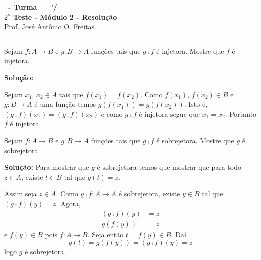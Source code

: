 \documentclass[12pt]{exam}
\begin{document}
\begin{center}
{\Large\bf \disciplina\ - Turma \turma\ -- \semestre$^{o}$/\ano} \\ \vspace{9pt} {\large\bf
$2^{\underline{o}}$ Teste - M\'odulo 2 - Resolu\c{c}\~ao}\\
\vspace{9pt} Prof. Jos{\'e} Ant{\^o}nio O. Freitas
\end{center}
\hrule

\vspace{.6cm}

\questao Sejam $f : A \to B$ e $g : B \to A$ fun\c{c}\~oes tais que $g \comp f$ \'e injetora. Mostre que $f$ \'e injetora.

\noindent\textbf{Solu\c{c}\~ao:}

	Sejam $x_1$, $x_2 \in A$ tais que $f(x_1) = f(x_2)$. Como $f(x_1)$, $f(x_2) \in B$ e $g : B \to A$ \'e uma fun\c{c}\~ao temos $g(f(x_1)) = g(f(x_2))$. Isto \'e, $(g \comp f)(x_1) = (g \comp f)(x_2)$ e como $g \comp f$ \'e injetora segue que $x_1 = x_2$. Portanto $f$ \'e injetora.

\vspace{.5cm}

\questao Sejam $f : A \to B$ e $g : B \to A$ fun\c{c}\~oes tais que $g \comp f$ \'e sobrejetora. Mostre que $g$ \'e sobrejetora.

\noindent\textbf{Solu\c{c}\~ao:} Para mostrar que $g$ é sobrejetora temos que mostrar que para todo $z \in A$, existe $t \in B$ tal que $g(t) = z$.

Assim seja $z \in A$. Como $g \comp f : A \to A$ é sobrejetora, existe $y \in B$ tal que $(g\comp f)(y) = z$. Agora,
\begin{align*}
    (g\comp f)(y) &= z\\
    g(f(y)) &= z
\end{align*}
e $f(y) \in B$ pois $f : A \to B$. Seja então $t = f(y) \in B$. Daí
\[
    g(t) = g(f(y)) = (g \comp f)(y) = z
\]
logo $g$ é sobrejetora.
\end{document}
